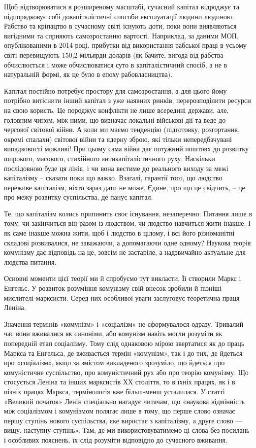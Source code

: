 \documentclass[../main]{subfiles}
\begin{document}
Щоб відтворюватися в розширеному масштабі, сучасний капітал відроджує та підпорядковує собі докапіталістичні способи експлуатації людини людиною. Рабство та кріпацтво в сучасному світі існують доти, поки вони виявляються вигідними та сприяють самозростанню вартості. Наприклад, за даними МОП, опублікованими в 2014 році, прибутки від використання рабської праці в усьому світі перевищують 150,2 мільярди доларів (як бачите, вигода від рабства обчислюється і може обчислюватися суто в капіталістичний спосіб, а не в натуральній формі, як це було в епоху рабовласництва).

Капітал постійно потребує простору для самозростання, а для цього йому потрібно витіснити інший капітал з уже наявних ринків, перерозподілити ресурси на свою користь. Це породжує конфлікти не лише всередині держави, але, головним чином, між ними, що визначає локальні військові дії та веде до чергової світової війни. А коли ми маємо тенденцію (підготовку, розгортання, окремі спалахи) світової війни та ядерну зброю, які тільки непередбачувані випадковості можливі! При цьому сама війна дає потужний поштовх до розвитку широкого, масового, стихійного антикапіталістичного руху. Наскільки послідовною буде ця лінія, і чи вона вестиме до реального виходу за межі капіталізму – сказати поки що важко. Взагалі, гарантії того, що людство переживе капіталізм, ніхто зараз дати не може. Єдине, про що це свідчить, – це про межу розвитку суспільства, де панує капітал.

Те, що капіталізм колись припинить своє існування, незаперечно. Питання лише в тому, чи закінчиться він разом із людством, чи людство навчиться жити інакше. І як саме інакше можна жити, щоб і людство в цілому, і всі його різноманітні складові розвивалися, не заважаючи, а допомагаючи одне одному? Наукова теорія комунізму дає відповідь на це, зовсім не застаріле, а надзвичайно актуальне для людства питання.

Основні моменти цієї теорії ми й спробуємо тут викласти. Її створили Маркс і Енгельс. У розвиток розуміння комунізму свій внесок зробили й пізніші мислителі-марксисти. Серед них особливої уваги заслуговує теоретична праця Леніна.

Значення термінів «комунізм» і «соціалізм» не сформувалося одразу. Тривалий час вони вживалися як синоніми, або комунізм навіть могли розуміти як попередній етап соціалізму. Тому слід однаковою мірою звертатися як до праць Маркса та Енгельса, де вживається термін «комунізм», так і до тих, де йдеться про «соціалізм», якщо за змістом викладеного зрозуміло, що йдеться про комуністичне суспільство, про комуністичний рух або про теорію комунізму. Що стосується Леніна та інших марксистів ХХ століття, то в їхніх працях, як і в пізніх працях Маркса, термінологія вже більш-менш усталилася. У статті «Великий початок» Ленін спеціально нагадує читачам, що «наукова відмінність між соціалізмом і комунізмом полягає лише в тому, що перше слово означає першу ступінь нового суспільства, яке виростає з капіталізму, а друге слово — вищу, наступну ступінь». Там, де ми використовуватимемо ці слова без посилань і особливих пояснень, їх слід розуміти відповідно до сучасного вживання.
\end{document}
